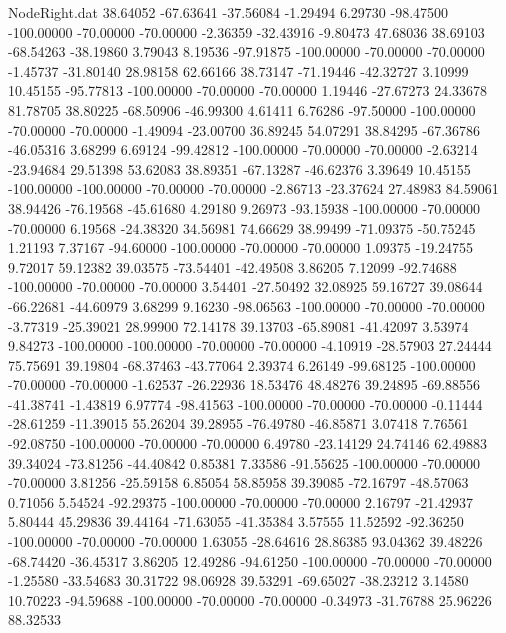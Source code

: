 \begin{filecontents}{NodeRight.dat}
  38.64052  -67.63641  -37.56084    -1.29494    6.29730  -98.47500 -100.00000  -70.00000  -70.00000   -2.36359  -32.43916   -9.80473   47.68036
  38.69103  -68.54263  -38.19860     3.79043    8.19536  -97.91875 -100.00000  -70.00000  -70.00000   -1.45737  -31.80140   28.98158   62.66166
  38.73147  -71.19446  -42.32727     3.10999   10.45155  -95.77813 -100.00000  -70.00000  -70.00000    1.19446  -27.67273   24.33678   81.78705
  38.80225  -68.50906  -46.99300     4.61411    6.76286  -97.50000 -100.00000  -70.00000  -70.00000   -1.49094  -23.00700   36.89245   54.07291
  38.84295  -67.36786  -46.05316     3.68299    6.69124  -99.42812 -100.00000  -70.00000  -70.00000   -2.63214  -23.94684   29.51398   53.62083
  38.89351  -67.13287  -46.62376     3.39649   10.45155 -100.00000 -100.00000  -70.00000  -70.00000   -2.86713  -23.37624   27.48983   84.59061
  38.94426  -76.19568  -45.61680     4.29180    9.26973  -93.15938 -100.00000  -70.00000  -70.00000    6.19568  -24.38320   34.56981   74.66629
  38.99499  -71.09375  -50.75245     1.21193    7.37167  -94.60000 -100.00000  -70.00000  -70.00000    1.09375  -19.24755    9.72017   59.12382
  39.03575  -73.54401  -42.49508     3.86205    7.12099  -92.74688 -100.00000  -70.00000  -70.00000    3.54401  -27.50492   32.08925   59.16727
  39.08644  -66.22681  -44.60979     3.68299    9.16230  -98.06563 -100.00000  -70.00000  -70.00000   -3.77319  -25.39021   28.99900   72.14178
  39.13703  -65.89081  -41.42097     3.53974    9.84273 -100.00000 -100.00000  -70.00000  -70.00000   -4.10919  -28.57903   27.24444   75.75691
  39.19804  -68.37463  -43.77064     2.39374    6.26149  -99.68125 -100.00000  -70.00000  -70.00000   -1.62537  -26.22936   18.53476   48.48276
  39.24895  -69.88556  -41.38741    -1.43819    6.97774  -98.41563 -100.00000  -70.00000  -70.00000   -0.11444  -28.61259  -11.39015   55.26204
  39.28955  -76.49780  -46.85871     3.07418    7.76561  -92.08750 -100.00000  -70.00000  -70.00000    6.49780  -23.14129   24.74146   62.49883
  39.34024  -73.81256  -44.40842     0.85381    7.33586  -91.55625 -100.00000  -70.00000  -70.00000    3.81256  -25.59158    6.85054   58.85958
  39.39085  -72.16797  -48.57063     0.71056    5.54524  -92.29375 -100.00000  -70.00000  -70.00000    2.16797  -21.42937    5.80444   45.29836
  39.44164  -71.63055  -41.35384     3.57555   11.52592  -92.36250 -100.00000  -70.00000  -70.00000    1.63055  -28.64616   28.86385   93.04362
  39.48226  -68.74420  -36.45317     3.86205   12.49286  -94.61250 -100.00000  -70.00000  -70.00000   -1.25580  -33.54683   30.31722   98.06928
  39.53291  -69.65027  -38.23212     3.14580   10.70223  -94.59688 -100.00000  -70.00000  -70.00000   -0.34973  -31.76788   25.96226   88.32533

\end{filecontents}
